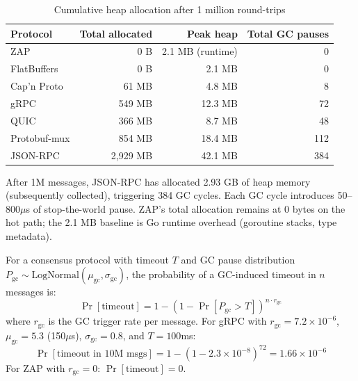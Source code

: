 \begin{table}[h]
\centering
\caption{Cumulative heap allocation after 1 million round-trips}
\label{tab:heap}
\begin{tabular}{lrrr}
\toprule
\textbf{Protocol} & \textbf{Total allocated} & \textbf{Peak heap} & \textbf{Total GC pauses} \\
\midrule
\rowcolor{luxblue!10}
ZAP & 0 B & 2.1 MB (runtime) & 0 \\
FlatBuffers & 0 B & 2.1 MB & 0 \\
Cap'n Proto & 61 MB & 4.8 MB & 8 \\
gRPC & 549 MB & 12.3 MB & 72 \\
QUIC & 366 MB & 8.7 MB & 48 \\
Protobuf-mux & 854 MB & 18.4 MB & 112 \\
JSON-RPC & 2,929 MB & 42.1 MB & 384 \\
\bottomrule
\end{tabular}
\end{table}

After 1M messages, JSON-RPC has allocated 2.93 GB of heap memory (subsequently collected), triggering 384 GC cycles. Each GC cycle introduces 50--800$\mu$s of stop-the-world pause. ZAP's total allocation remains at 0 bytes on the hot path; the 2.1 MB baseline is Go runtime overhead (goroutine stacks, type metadata).

\begin{corollary}
\label{cor:timeout}
For a consensus protocol with timeout $T$ and GC pause distribution $P_{\text{gc}} \sim \text{LogNormal}(\mu_{\text{gc}}, \sigma_{\text{gc}})$, the probability of a GC-induced timeout in $n$ messages is:
\[
\Pr[\text{timeout}] = 1 - \left(1 - \Pr[P_{\text{gc}} > T]\right)^{n \cdot r_{\text{gc}}}
\]
where $r_{\text{gc}}$ is the GC trigger rate per message. For gRPC with $r_{\text{gc}} = 7.2 \times 10^{-6}$, $\mu_{\text{gc}} = 5.3$ (150$\mu$s), $\sigma_{\text{gc}} = 0.8$, and $T = 100$ms:
\[
\Pr[\text{timeout in 10M msgs}] = 1 - (1 - 2.3 \times 10^{-8})^{72} = 1.66 \times 10^{-6}
\]
For ZAP with $r_{\text{gc}} = 0$: $\Pr[\text{timeout}] = 0$.
\end{corollary}

